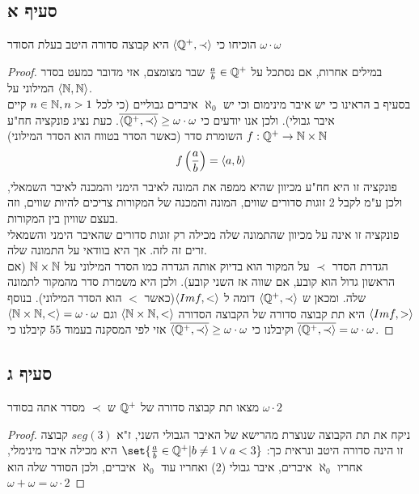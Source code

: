 \documentclass{article}
\DeclarePairedDelimiter\set\{\}
\begin{document}
    \subsection*{סעיף א}
    הוכיחו כי $\langle \mathbb{Q}^{+}, \prec \rangle$ היא קבוצה סדורה היטב בעלת הסודר $\omega \cdot \omega$
    \begin{proof}
        במילים אחרות, אם נסתכל על $\frac{a}{b} \in \mathbb{Q}^{+}$ שבר מצומצם, אזי מדובר כמעט בסדר המילוני על $\langle \mathbb{N},\mathbb{N} \rangle$. \\
        בסעיף ב הראינו כי יש איבר מינימום וכי יש $\aleph_0$ איברים גבוליים (כי לכל $n \in \mathbb{N}, n > 1$ קיים איבר גבולי).
        ולכן אנו יודעים כי $\overline{\langle \mathbb{Q}^{+}, \prec \rangle} \geq \omega \cdot \omega$.
        כעת נציג פונקציה חח"ע $f: \mathbb{Q}^{+} \rightarrow \mathbb{N} \times \mathbb{N}$ השומרת סדר (כאשר הסדר בטווח הוא הסדר המילוני)
        \[ f\left( \frac{a}{b} \right) = \langle a, b \rangle \]
        פונקציה זו היא חח"ע מכיוון שהיא ממפה את המונה לאיבר הימני והמכנה לאיבר השמאלי, ולכן ע"מ לקבל 2 זוגות סדורים שווים, המונה והמכנה של המקורות צריכים להיות שווים, וזה בעצם שוויון בין המקורות. \\
        פונקציה זו אינה על מכיוון שהתמונה שלה מכילה רק זוגות סדורים שהאיבר הימני והשמאלי זרים זה לזה. אך היא בוודאי על התמונה שלה. \\
        הגדרת הסדר $\prec$ על המקור הוא בדיוק אותה הגדרה כמו הסדר המילוני על $\mathbb{N} \times \mathbb{N}$ (אם הראשון גדול הוא קובע, אם שווה אז השני קובע).
        ולכן היא משמרת סדר מהמקור לתמונה שלה. ומכאן ש $\langle \mathbb{Q}^{+}, \prec \rangle$ דומה ל $\langle Im f, < \rangle$(כאשר $<$ הוא הסדר המילוני).
        בנוסף $\langle Im f, > \rangle$ היא תת קבוצה סדורה של הקבוצה הסדורה $\langle \mathbb{N} \times \mathbb{N}, < \rangle$ וגם $\langle \mathbb{N} \times \mathbb{N}, < \rangle = \omega \cdot \omega$
        וקיבלנו כי $\overline{\langle \mathbb{Q}^{+}, \prec \rangle} \geq \omega \cdot \omega$
        אזי לפי המסקנה בעמוד 55 קיבלנו כי $\overline{\langle \mathbb{Q}^{+}, \prec \rangle} = \omega \cdot \omega$.
    \end{proof}

    \subsection*{סעיף ג}
    מצאו תת קבוצה סדורה של $\mathbb{Q}^{+}$ ש $\prec$ מסדר אתה בסודר $\omega \cdot 2$
    \begin{proof}
        ניקח את תת הקבוצה שנוצרת מהרישא של האיבר הגבולי השני, ז"א $seg(3)$ קבוצה זו הינה סדורה היטב ונראית כך: $\set{\frac{a}{b} \in \QQ^{+} | b \neq 1 \lor a < 3}$
        היא מכילה איבר מינימלי, אחריו $\aleph_0$ איברים, איבר גבולי (2) ואחריו עוד $\aleph_0$ איברים, ולכן הסודר שלה הוא $\omega + \omega = \omega \cdot 2$
    \end{proof}
\end{document}
